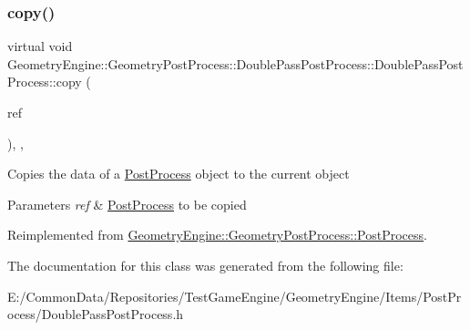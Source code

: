 \subsubsection{\texorpdfstring{copy()}{copy()}}
{\footnotesize\ttfamily virtual void Geometry\+Engine\+::\+Geometry\+Post\+Process\+::\+Double\+Pass\+Post\+Process\+::\+Double\+Pass\+Post\+Process\+::copy (\begin{DoxyParamCaption}\item[{const \mbox{\hyperlink{class_geometry_engine_1_1_geometry_post_process_1_1_post_process}{Post\+Process}} \&}]{ref }\end{DoxyParamCaption})\hspace{0.3cm}{\ttfamily [inline]}, {\ttfamily [protected]}, {\ttfamily [virtual]}}

Copies the data of a \mbox{\hyperlink{class_geometry_engine_1_1_geometry_post_process_1_1_post_process}{Post\+Process}} object to the current object 
\begin{DoxyParams}{Parameters}
{\em ref} & \mbox{\hyperlink{class_geometry_engine_1_1_geometry_post_process_1_1_post_process}{Post\+Process}} to be copied \\
\hline
\end{DoxyParams}


Reimplemented from \mbox{\hyperlink{class_geometry_engine_1_1_geometry_post_process_1_1_post_process_aba093c175b228894204e785a5a54e6e9}{Geometry\+Engine\+::\+Geometry\+Post\+Process\+::\+Post\+Process}}.



The documentation for this class was generated from the following file\+:\begin{DoxyCompactItemize}
\item 
E\+:/\+Common\+Data/\+Repositories/\+Test\+Game\+Engine/\+Geometry\+Engine/\+Items/\+Post\+Process/Double\+Pass\+Post\+Process.\+h\end{DoxyCompactItemize}
